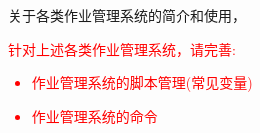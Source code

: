 \documentclass{article}      %
\begin{document}
关于各类作业管理系统的简介和使用，\textcolor{red}{针对上述各类作业管理系统，请完善:~\\
\begin{itemize}
	\item 作业管理系统的脚本管理(常见变量)
	\item 作业管理系统的命令
\end{itemize}}



\end{document}
